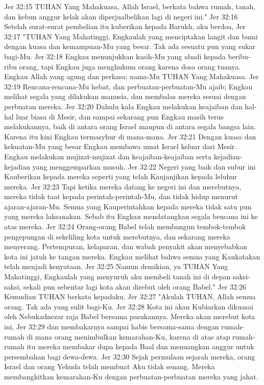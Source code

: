 Jer 32:15  TUHAN Yang Mahakuasa, Allah Israel, berkata bahwa rumah, tanah, dan kebun anggur kelak akan diperjualbelikan lagi di negeri ini."
Jer 32:16  Setelah surat-surat pembelian itu kuberikan kepada Barukh, aku berdoa,
Jer 32:17  "TUHAN Yang Mahatinggi, Engkaulah yang menciptakan langit dan bumi dengan kuasa dan kemampuan-Mu yang besar. Tak ada sesuatu pun yang sukar bagi-Mu.
Jer 32:18  Engkau menunjukkan kasih-Mu yang abadi kepada beribu-ribu orang, tapi Engkau juga menghukum orang karena dosa orang tuanya. Engkau Allah yang agung dan perkasa; nama-Mu TUHAN Yang Mahakuasa.
Jer 32:19  Rencana-rencana-Mu hebat, dan perbuatan-perbuatan-Mu ajaib; Engkau melihat segala yang dilakukan manusia, dan membalas mereka sesuai dengan perbuatan mereka.
Jer 32:20  Dahulu kala Engkau melakukan keajaiban dan hal-hal luar biasa di Mesir, dan sampai sekarang pun Engkau masih terus melakukannya, baik di antara orang Israel maupun di antara segala bangsa lain. Karena itu kini Engkau termasyhur di mana-mana.
Jer 32:21  Dengan kuasa dan kekuatan-Mu yang besar Engkau membawa umat Israel keluar dari Mesir. Engkau melakukan mujizat-mujizat dan keajaiban-keajaiban serta kejadian-kejadian yang menggemparkan musuh.
Jer 32:22  Negeri yang baik dan subur ini Kauberikan kepada mereka seperti yang telah Kaujanjikan kepada leluhur mereka.
Jer 32:23  Tapi ketika mereka datang ke negeri ini dan merebutnya, mereka tidak taat kepada perintah-perintah-Mu, dan tidak hidup menurut ajaran-ajaran-Mu. Semua yang Kauperintahkan kepada mereka tidak satu pun yang mereka laksanakan. Sebab itu Engkau mendatangkan segala bencana ini ke atas mereka.
Jer 32:24  Orang-orang Babel telah membangun tembok-tembok pengepungan di sekeliling kota untuk merebutnya, dan sekarang mereka menyerang. Pertempuran, kelaparan, dan wabah penyakit akan menyebabkan kota ini jatuh ke tangan mereka. Engkau melihat bahwa semua yang Kaukatakan telah menjadi kenyataan.
Jer 32:25  Namun demikian, ya TUHAN Yang Mahatinggi, Engkaulah yang menyuruh aku membeli tanah ini di depan saksi-saksi, sekali pun sebentar lagi kota akan direbut oleh orang Babel."
Jer 32:26  Kemudian TUHAN berkata kepadaku,
Jer 32:27  "Akulah TUHAN, Allah semua orang. Tak ada yang sulit bagi-Ku.
Jer 32:28  Kota ini akan Kubiarkan dikuasai oleh Nebukadnezar raja Babel bersama pasukannya. Mereka akan merebut kota ini,
Jer 32:29  dan membakarnya sampai habis bersama-sama dengan rumah-rumah di mana orang menimbulkan kemarahan-Ku, karena di atas atap rumah-rumah itu mereka membakar dupa kepada Baal dan menuangkan anggur untuk persembahan bagi dewa-dewa.
Jer 32:30  Sejak permulaan sejarah mereka, orang Israel dan orang Yehuda telah membuat Aku tidak senang. Mereka membangkitkan kemarahan-Ku dengan perbuatan-perbuatan mereka yang jahat.
